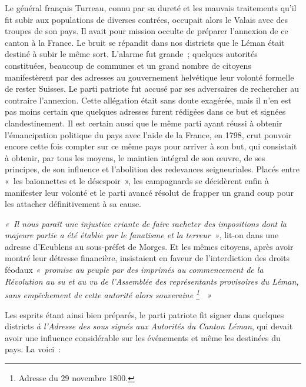 \documentclass[french,twoside]{book} %
\begin{document}
Le général français Turreau, connu par sa dureté et les mauvais traitements qu’il fit subir aux populations de diverses contrées, occupait alors le Valais avec des troupes de son pays. Il avait pour mission occulte de préparer l’annexion de ce canton à la France. Le bruit se répandit dans nos districts que le Léman était destiné à subir le même sort. L’alarme fut grande ; quelques autorités constituées, beaucoup de communes et un grand nombre de citoyens manifestèrent par des adresses au gouvernement helvétique leur volonté formelle de rester Suisses. Le parti patriote fut accusé par ses adversaires de rechercher au contraire l’annexion. Cette allégation était sans doute exagérée, mais il n’en est pas moins certain que quelques adresses furent rédigées dans ce but et signées clandestinement. Il est certain aussi que le même parti ayant réussi à obtenir l’émancipation politique du pays avec l’aide de la France, en 1798, crut pouvoir encore cette fois compter sur ce même pays pour arriver à son but, qui consistait à obtenir, par tous les moyens, le maintien intégral de son œuvre, de ses principes, de son influence et l’abolition des redevances seigneuriales. Placés entre « les baïonnettes et le désespoir », les campagnards se décidèrent enfin à manifester leur volonté et le parti avancé résolut de frapper un grand coup pour les attacher définitivement à sa cause.\par
\emph{« Il nous paraît une injustice criante de faire racheter des impositions dont la majeure partie a été établie par le fanatisme et la terreur »}, lit-on dans une adresse d’Ecublens au sous-préfet de Morges. Et les mêmes citoyens, après avoir montré leur détresse financière, insistaient en faveur de l’interdiction des droits féodaux \emph{« promise au peuple par des imprimés au commencement de la Révolution au su et au vu de l’Assemblée des représentants provisoires du Léman, sans empêchement de cette autorité alors souveraine \footnote{Adresse du 29 novembre 1800.}  »}\par
Les esprits étant ainsi bien préparés, le parti patriote fit signer dans quelques districts \emph{à l’Adresse des sous signés aux Autorités du Canton Léman}, qui devait avoir une influence considérable sur les événements et même les destinées du pays. La voici :\par
\end{document}
